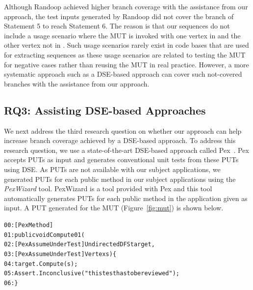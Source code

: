 \documentclass{sig-alternate}
\begin{document}
Although Randoop achieved higher branch coverage with the assistance from our approach, the test inputs generated by Randoop did not cover the  branch of Statement 5 to reach Statement 6. The reason is that our sequences do not include a usage scenario where the  MUT is invoked with one vertex in  and the other vertex not in . Such usage scenarios rarely exist in code bases that are used for extracting sequences as these usage scenarios are related to testing the MUT for negative cases rather than reusing the MUT in real practice. However, a more systematic approach such as a DSE-based approach can cover such not-covered branches with the assistance from our approach.

\subsection{RQ3: Assisting DSE-based Approaches}

We next address the third research question on whether our approach can help increase branch coverage achieved by a DSE-based approach. To address this research question, we use a state-of-the-art DSE-based approach called Pex~\cite{tillman:pexwhite}. Pex accepts PUTs as input and generates conventional unit tests from these PUTs using DSE. As PUTs are not available with our subject applications, we generated PUTs for each public method in our subject applications using the \emph{PexWizard} tool. PexWizard is a tool provided with Pex and this tool automatically generates PUTs for each public method in the application given as input. A PUT generated for the  MUT (Figure~\ref{fig:mut}) is shown below.

\begin{CodeOut}
\begin{alltt}
00:[PexMethod]
01:public void Compute01(
02:\hspace*{0.3in}[PexAssumeUnderTest]UndirectedDFS target,
03:\hspace*{0.3in}[PexAssumeUnderTest]Vertex s) \{
04:\hspace*{0.1in}target.Compute(s);
05:\hspace*{0.1in}Assert.Inconclusive("this test has to be reviewed");
06:\}
\end{alltt}
\end{CodeOut}
\end{document}
